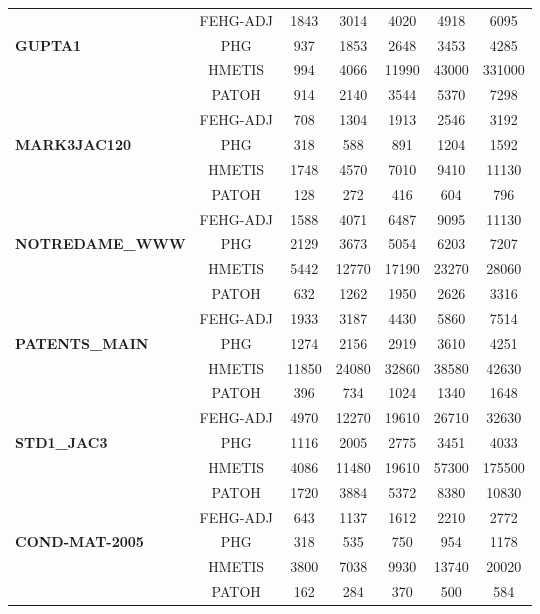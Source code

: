 \documentclass[twocolumn]{svjour3}          \smartqed
\begin{document}
\begin{table*}[t]
{\begin{threeparttable}
\begin{tabular}{|l|c|ccccc|}
&FEHG-ADJ& 	1843& 	3014& 	4020& 	4918& 	6095\\
			\textbf{ GUPTA1}
			&PHG	& 	937& 	1853& 	2648& 	3453& 	4285\\
			&HMETIS	& 	994& 	4066& 	11990& 	43000& 	331000\\
			&PATOH	& 	914& 	2140& 	3544& 	5370& 	7298\\
			\hline

&FEHG-ADJ& 	708& 	1304& 	1913& 	2546& 	3192\\
			\textbf{ MARK3JAC120}
			&PHG	& 	318& 	588& 	891& 	1204& 	1592\\
			&HMETIS	& 	1748& 	4570& 	7010& 	9410& 	11130\\
			&PATOH	& 	128& 	272& 	416& 	604& 	796\\
			\hline

&FEHG-ADJ& 	1588& 	4071& 	6487& 	9095& 	11130\\
			\textbf{ NOTREDAME\_WWW}
			&PHG	& 	2129& 	3673& 	5054& 	6203& 	7207\\
			&HMETIS	& 	5442& 	12770& 	17190& 	23270& 	28060\\
			&PATOH	& 	632& 	1262& 	1950& 	2626& 	3316\\
			\hline

&FEHG-ADJ& 	1933& 	3187& 	4430& 	5860& 	7514\\
			\textbf{ PATENTS\_MAIN}
			&PHG	& 	1274& 	2156& 	2919& 	3610& 	4251\\
			&HMETIS	& 	11850& 	24080& 	32860& 	38580& 	42630\\
			&PATOH	& 	396& 	734& 	1024& 	1340& 	1648\\
			\hline

&FEHG-ADJ& 	4970& 	12270& 	19610& 	26710& 	32630\\
			\textbf{ STD1\_JAC3}
			&PHG	 & 	1116& 	2005& 	2775& 	3451& 	4033\\
			&HMETIS	 & 	4086& 	11480& 	19610& 	57300& 	175500\\
			&PATOH	 & 	1720& 	3884& 	5372& 	8380& 	10830\\
			\hline

&FEHG-ADJ& 	643& 	1137& 	1612& 	2210& 	2772\\
			\textbf{ COND-MAT-2005}
			&PHG	& 	318& 	535& 	750& 	954& 	1178\\
			&HMETIS	& 	3800& 	7038& 	9930& 	13740& 	20020\\
			&PATOH	& 	162& 	284& 	370& 	500& 	584\\

			\hline
		\end{tabular}
	\end{threeparttable}
	}	\end{table*}
\end{document}
